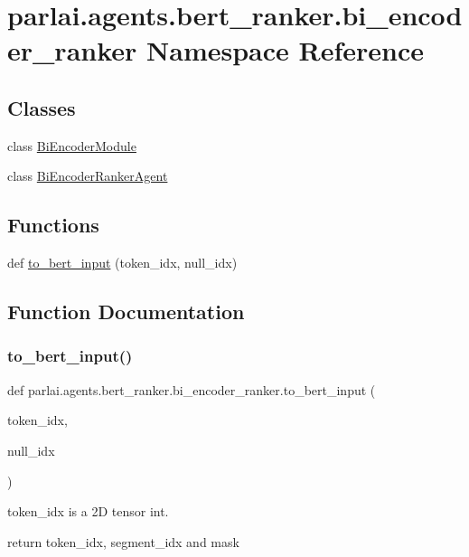 \hypertarget{namespaceparlai_1_1agents_1_1bert__ranker_1_1bi__encoder__ranker}{}\section{parlai.\+agents.\+bert\+\_\+ranker.\+bi\+\_\+encoder\+\_\+ranker Namespace Reference}
\label{namespaceparlai_1_1agents_1_1bert__ranker_1_1bi__encoder__ranker}
\subsection*{Classes}
\begin{DoxyCompactItemize}
\item 
class \hyperlink{classparlai_1_1agents_1_1bert__ranker_1_1bi__encoder__ranker_1_1BiEncoderModule}{Bi\+Encoder\+Module}
\item 
class \hyperlink{classparlai_1_1agents_1_1bert__ranker_1_1bi__encoder__ranker_1_1BiEncoderRankerAgent}{Bi\+Encoder\+Ranker\+Agent}
\end{DoxyCompactItemize}
\subsection*{Functions}
\begin{DoxyCompactItemize}
\item 
def \hyperlink{namespaceparlai_1_1agents_1_1bert__ranker_1_1bi__encoder__ranker_afd88e1e1699d975ab19ea38e8ae77e20}{to\+\_\+bert\+\_\+input} (token\+\_\+idx, null\+\_\+idx)
\end{DoxyCompactItemize}


\subsection{Function Documentation}
\mbox{\label{namespaceparlai_1_1agents_1_1bert__ranker_1_1bi__encoder__ranker_afd88e1e1699d975ab19ea38e8ae77e20}} 
\subsubsection{\texorpdfstring{to\+\_\+bert\+\_\+input()}{to\_bert\_input()}}
{\footnotesize\ttfamily def parlai.\+agents.\+bert\+\_\+ranker.\+bi\+\_\+encoder\+\_\+ranker.\+to\+\_\+bert\+\_\+input (\begin{DoxyParamCaption}\item[{}]{token\+\_\+idx,  }\item[{}]{null\+\_\+idx }\end{DoxyParamCaption})}

\begin{DoxyVerb}token_idx is a 2D tensor int.

return token_idx, segment_idx and mask
\end{DoxyVerb}
 